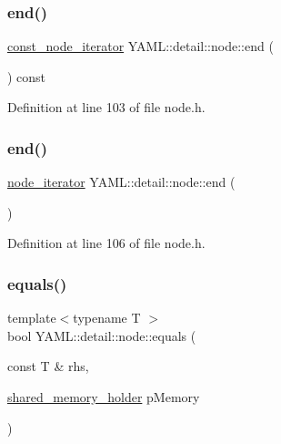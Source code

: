 \subsubsection{\texorpdfstring{end()}{end()}\hspace{0.1cm}{\footnotesize\ttfamily [1/2]}}
{\footnotesize\ttfamily \mbox{\hyperlink{namespace_y_a_m_l_1_1detail_a049af8e269401cbe1e735033914e4356}{const\+\_\+node\+\_\+iterator}} Y\+A\+M\+L\+::detail\+::node\+::end (\begin{DoxyParamCaption}{ }\end{DoxyParamCaption}) const\hspace{0.3cm}{\ttfamily [inline]}}



Definition at line 103 of file node.\+h.

\mbox{\label{class_y_a_m_l_1_1detail_1_1node_a4199ba4fc7950191565b74d67a812f5a}} 
\subsubsection{\texorpdfstring{end()}{end()}\hspace{0.1cm}{\footnotesize\ttfamily [2/2]}}
{\footnotesize\ttfamily \mbox{\hyperlink{namespace_y_a_m_l_1_1detail_aa2a961156810d41a3b6744c10186afac}{node\+\_\+iterator}} Y\+A\+M\+L\+::detail\+::node\+::end (\begin{DoxyParamCaption}{ }\end{DoxyParamCaption})\hspace{0.3cm}{\ttfamily [inline]}}



Definition at line 106 of file node.\+h.

\mbox{\label{class_y_a_m_l_1_1detail_1_1node_ac267a4fe42e731110d01e2b8b699baee}} 
\subsubsection{\texorpdfstring{equals()}{equals()}\hspace{0.1cm}{\footnotesize\ttfamily [1/2]}}
{\footnotesize\ttfamily template$<$typename T $>$ \\
bool Y\+A\+M\+L\+::detail\+::node\+::equals (\begin{DoxyParamCaption}\item[{const T \&}]{rhs,  }\item[{\mbox{\hyperlink{namespace_y_a_m_l_1_1detail_a228c4b3b6ba1058b474d40afc218e21d}{shared\+\_\+memory\+\_\+holder}}}]{p\+Memory }\end{DoxyParamCaption})\hspace{0.3cm}{\ttfamily [inline]}}




